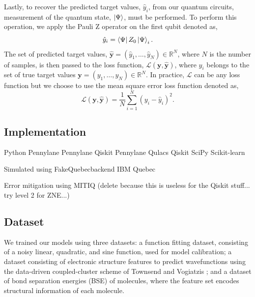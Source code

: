 \documentclass[journal=jacsat,manuscript=article]{achemso}
\begin{document}
Lastly, to recover the predicted target values, $\hat{y}_{i}$, from our quantum circuits, measurement of the quantum state, $\ket{\Psi}$, must be performed.
To perform this operation, we apply the Pauli Z operator on the first qubit denoted as,
\begin{equation}
	\hat{y}_{i} = \bra{\Psi}Z_{0}\ket{\Psi}_{i}.
	\label{eq:y_pred}
\end{equation}
The set of predicted target values, $\bm{\hat{y}} = (\hat{y}_{1}, \ldots, \hat{y}_{N}) \in \mathbb{R}^{N}$, where $N$ is the number of samples, is then passed to the loss function, $\mathcal{L}(\bm{y}, \bm{\hat y})$, where $y_{i}$ belongs to the set of true target values $\bm{y} = (y_{1}, \ldots, y_{N}) \in \mathbb{R}^{N}$.
In practice, $\mathcal{L}$ can be any loss function but we choose to use the mean square error loss function denoted as,
\begin{equation}
	\mathcal{L}(\bm{y}, \bm{\hat y}) = \frac{1}{N} \sum_{i=1}^{N} (y_{i} - \hat{y}_{i})^{2}.
	\label{eq:isthisloss}
\end{equation}


\subsection{Implementation}
Python
Pennylane
Pennylane Qiskit
Pennylane Qulacs
Qiskit
SciPy
Scikit-learn


Simulated using FakeQuebecbackend
IBM Quebec

Error mitigation using
MITIQ (delete because this is useless for the Qiskit stuff... try level 2 for ZNE...)


\subsection{Dataset}
We trained our models using three datasets: a function fitting dataset, consisting of a noisy linear, quadratic, and sine function, used for model calibration; a dataset consisting of electronic structure features to predict wavefunctions using the data-driven coupled-cluster scheme of Townsend and Vogiatzis \cite{townsend_data-driven_2019}; and a dataset of bond separation energies (BSE) of molecules, where the feature set encodes structural information of each molecule. 
\end{document}
